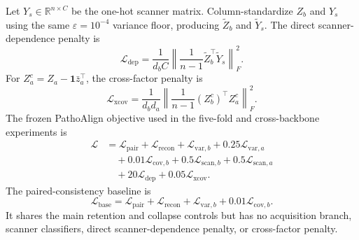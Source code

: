 Let $Y_s\in\mathbb{R}^{n\times C}$ be the one-hot scanner matrix. Column-standardize $Z_b$ and $Y_s$ using the same $\varepsilon=10^{-4}$ variance floor, producing $\widetilde Z_b$ and $\widetilde Y_s$. The direct scanner-dependence penalty is
\begin{equation}
 \mathcal{L}_{\mathrm{dep}}
 =\frac{1}{d_bC}
  \left\lVert
   \frac{1}{n-1}\widetilde Z_b^{\top}\widetilde Y_s
  \right\rVert_F^2.
\end{equation}
For $Z_a^c=Z_a-\mathbf{1}\bar z_a^{\top}$, the cross-factor penalty is
\begin{equation}
 \mathcal{L}_{\mathrm{xcov}}
 =\frac{1}{d_bd_a}
  \left\lVert
   \frac{1}{n-1}(Z_b^c)^{\top}Z_a^c
  \right\rVert_F^2.
\end{equation}
The frozen PathoAlign objective used in the five-fold and cross-backbone experiments is
\begin{align}
 \mathcal{L}
 &=\mathcal{L}_{\mathrm{pair}}
 +\mathcal{L}_{\mathrm{recon}}
 +\mathcal{L}_{\mathrm{var},b}
 +0.25\mathcal{L}_{\mathrm{var},a} \\
 &\quad
 +0.01\mathcal{L}_{\mathrm{cov},b}
 +0.5\mathcal{L}_{\mathrm{scan},b}
 +0.5\mathcal{L}_{\mathrm{scan},a} \\
 &\quad
 +20\mathcal{L}_{\mathrm{dep}}
 +0.05\mathcal{L}_{\mathrm{xcov}}.
\end{align}
The paired-consistency baseline is
\begin{equation}
 \mathcal{L}_{\mathrm{base}}
 =\mathcal{L}_{\mathrm{pair}}
 +\mathcal{L}_{\mathrm{recon}}
 +\mathcal{L}_{\mathrm{var},b}
 +0.01\mathcal{L}_{\mathrm{cov},b}.
\end{equation}
It shares the main retention and collapse controls but has no acquisition branch, scanner classifiers, direct scanner-dependence penalty, or cross-factor penalty.
